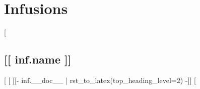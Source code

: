 \section*{Infusions}
[%
  \subsection*{[[ inf.name ]]}
  [%
  [%
  [[- inf.__doc__ | rst_to_latex(top_heading_level=2) -]]
[%
